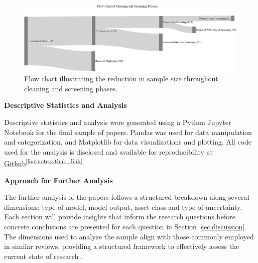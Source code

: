   \begin{figure}[h]
      \centering
      \includegraphics[width=1\linewidth]{Images/screening_funnel.png}
      \caption[Flow chart illustrating the sample size throughout cleaning and screening phases]{Flow chart illustrating the reduction in sample size throughout cleaning and screening phases.}
      \label{fig:screening_and_cleaning_funnel}
  \end{figure}

\textbf{Descriptive Statistics and Analysis}\nopagebreak

Descriptive statistics and analysis were generated using a Python Jupyter Notebook for the final sample of papers. Pandas was used for data manipulation and categorization, and Matplotlib for data visualizations and plotting. All code used for the analysis is disclosed and available for reproducibility at \href{https://github.com/tjespe/literature-review/}{Github}\textsuperscript{\ref{footnote:github_link}}.

\textbf{Approach for Further Analysis}\nopagebreak

The further analysis of the papers follows a structured breakdown along several dimensions: type of model, model output, asset class and type of uncertainty. Each section will provide insights that inform the research questions before concrete conclusions are presented for each question in Section \ref{sec:discussion}. The dimensions used to analyze the sample align with those commonly employed in similar reviews, providing a structured framework to effectively assess the current state of research \parencite{Blasco_et_al_2024}.

